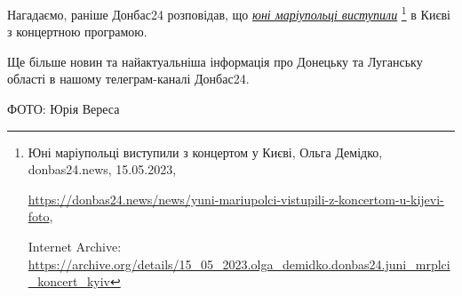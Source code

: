 
Нагадаємо, раніше Донбас24 розповідав, що \href{https://archive.org/details/15_05_2023.olga_demidko.donbas24.juni_mrplci_koncert_kyiv}{\emph{юні маріупольці виступили}}%
\footnote{Юні маріупольці виступили з концертом у Києві, Ольга Демідко, donbas24.news, 15.05.2023, \par%
\url{https://donbas24.news/news/yuni-mariupolci-vistupili-z-koncertom-u-kijevi-foto}, \par%
Internet Archive: \url{https://archive.org/details/15_05_2023.olga_demidko.donbas24.juni_mrplci_koncert_kyiv}%
} в Києві з концертною програмою.

Ще більше новин та найактуальніша інформація про Донецьку та Луганську області
в нашому телеграм-каналі Донбас24.

ФОТО: Юрія Вереса

